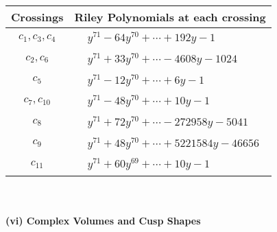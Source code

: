 \documentclass[1p]{elsarticle_modified}
\theoremstyle{definition}
\begin{document}
\begin{tabular}{m{50pt}|m{274pt}}
Crossings & \hspace{64pt}Riley Polynomials at each crossing \\
\hline $$\begin{aligned}c_{1},c_{3},c_{4}\end{aligned}$$&$\begin{aligned}
&y^{71}-64 y^{70}+\cdots+192 y-1
\end{aligned}$\\
\hline $$\begin{aligned}c_{2},c_{6}\end{aligned}$$&$\begin{aligned}
&y^{71}+33 y^{70}+\cdots-4608 y-1024
\end{aligned}$\\
\hline $$\begin{aligned}c_{5}\end{aligned}$$&$\begin{aligned}
&y^{71}-12 y^{70}+\cdots+6 y-1
\end{aligned}$\\
\hline $$\begin{aligned}c_{7},c_{10}\end{aligned}$$&$\begin{aligned}
&y^{71}-48 y^{70}+\cdots+10 y-1
\end{aligned}$\\
\hline $$\begin{aligned}c_{8}\end{aligned}$$&$\begin{aligned}
&y^{71}+72 y^{70}+\cdots-272958 y-5041
\end{aligned}$\\
\hline $$\begin{aligned}c_{9}\end{aligned}$$&$\begin{aligned}
&y^{71}+48 y^{70}+\cdots+5221584 y-46656
\end{aligned}$\\
\hline $$\begin{aligned}c_{11}\end{aligned}$$&$\begin{aligned}
&y^{71}+60 y^{69}+\cdots+10 y-1
\end{aligned}$\\
\hline
\end{tabular}\\~\\
\newpage\flushleft \textbf{(vi) Complex Volumes and Cusp Shapes}
\end{document}
